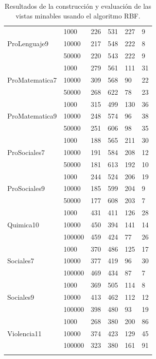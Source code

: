 \begin{longtable}{|p{3cm}|p{3cm}|p{2cm}|p{2cm}|p{2cm}|p{2cm}|}
\hline
\multirow{3}[6]{*}{ProLenguaje9} & 1000  & 226   & 531   & 227   & 9 \\
\cline{2-6}      & 10000 & 217   & 548   & 222   & 8 \\
\cline{2-6}      & 50000 & 220   & 543   & 222   & 9 \\
\hline
\multirow{3}[6]{*}{ProMatematica7} & 1000  & 279   & 561   & 111   & 31 \\
\cline{2-6}      & 10000 & 309   & 568   & 90    & 22 \\
\cline{2-6}      & 50000 & 268   & 622   & 78    & 23 \\
\hline
\multirow{3}[6]{*}{ProMatematica9} & 1000  & 315   & 499   & 130   & 36 \\
\cline{2-6}      & 10000 & 248   & 574   & 96    & 38 \\
\cline{2-6}      & 50000 & 251   & 606   & 98    & 35 \\
\hline
\multirow{3}[6]{*}{ProSociales7} & 1000  & 188   & 565   & 211   & 30 \\
\cline{2-6}      & 10000 & 191   & 584   & 208   & 12 \\
\cline{2-6}      & 50000 & 181   & 613   & 192   & 10 \\
\hline
\multirow{3}[6]{*}{ProSociales9} & 1000  & 244   & 524   & 206   & 19 \\
\cline{2-6}      & 10000 & 185   & 599   & 204   & 9 \\
\cline{2-6}      & 50000 & 177   & 608   & 203   & 7 \\
\hline
\multirow{3}[6]{*}{Quimica10} & 1000  & 431   & 411   & 126   & 28 \\
\cline{2-6}      & 10000 & 450   & 394   & 141   & 14 \\
\cline{2-6}      & 100000 & 459   & 424   & 77    & 26 \\
\hline
\multirow{3}[6]{*}{Sociales7} & 1000  & 370   & 486   & 125   & 17 \\
\cline{2-6}      & 10000 & 377   & 419   & 96    & 30 \\
\cline{2-6}      & 100000 & 469   & 434   & 87    & 7 \\
\hline
\multirow{3}[6]{*}{Sociales9} & 1000  & 369   & 505   & 114   & 8 \\
\cline{2-6}      & 10000 & 413   & 462   & 112   & 12 \\
\cline{2-6}      & 100000 & 398   & 480   & 93    & 19 \\
\hline
\multirow{3}[6]{*}{Violencia11} & 1000  & 268   & 380   & 200   & 86 \\
\cline{2-6}      & 10000 & 374   & 423   & 129   & 45 \\
\cline{2-6}      & 100000 & 323   & 380   & 161   & 91 \\
\hline
\caption{Resultados de la construcción y evaluación de las vistas minables usando el algoritmo RBF.}
\label{tab:cuadro37}
\end{longtable}
